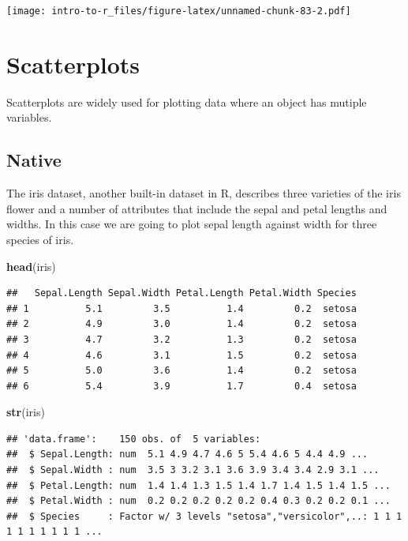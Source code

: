 \documentclass[a4paper]{book}
\newenvironment{Shaded}{\begin{snugshade}}{\end{snugshade}}
\newcommand{\KeywordTok}[1]{\textcolor[rgb]{0.13,0.29,0.53}{\textbf{{#1}}}}
\newcommand{\NormalTok}[1]{{#1}}
\renewenvironment{Shaded}
{\vspace{1.5em}\begin{leftbar}\begin{snugshade}}
{\end{snugshade}\end{leftbar}\vspace{3pt}}
\begin{document}
\texttt{[image: intro-to-r\_files/figure-latex/unnamed-chunk-83-2.pdf]}

\section{Scatterplots}\label{scatterplots}

Scatterplots are widely used for plotting data where an object has
mutiple variables.

\subsection{Native}\label{native-3}

The iris dataset, another built-in dataset in R, describes three
varieties of the iris flower and a number of attributes that include the
sepal and petal lengths and widths. In this case we are going to plot
sepal length against width for three species of iris.

\begin{Shaded}
\begin{Highlighting}[]
\KeywordTok{head}\NormalTok{(iris)}
\end{Highlighting}
\end{Shaded}

\begin{verbatim}
##   Sepal.Length Sepal.Width Petal.Length Petal.Width Species
## 1          5.1         3.5          1.4         0.2  setosa
## 2          4.9         3.0          1.4         0.2  setosa
## 3          4.7         3.2          1.3         0.2  setosa
## 4          4.6         3.1          1.5         0.2  setosa
## 5          5.0         3.6          1.4         0.2  setosa
## 6          5.4         3.9          1.7         0.4  setosa
\end{verbatim}

\begin{Shaded}
\begin{Highlighting}[]
\KeywordTok{str}\NormalTok{(iris)}
\end{Highlighting}
\end{Shaded}

\begin{verbatim}
## 'data.frame':    150 obs. of  5 variables:
##  $ Sepal.Length: num  5.1 4.9 4.7 4.6 5 5.4 4.6 5 4.4 4.9 ...
##  $ Sepal.Width : num  3.5 3 3.2 3.1 3.6 3.9 3.4 3.4 2.9 3.1 ...
##  $ Petal.Length: num  1.4 1.4 1.3 1.5 1.4 1.7 1.4 1.5 1.4 1.5 ...
##  $ Petal.Width : num  0.2 0.2 0.2 0.2 0.2 0.4 0.3 0.2 0.2 0.1 ...
##  $ Species     : Factor w/ 3 levels "setosa","versicolor",..: 1 1 1 1 1 1 1 1 1 1 ...
\end{verbatim}
\end{document}
